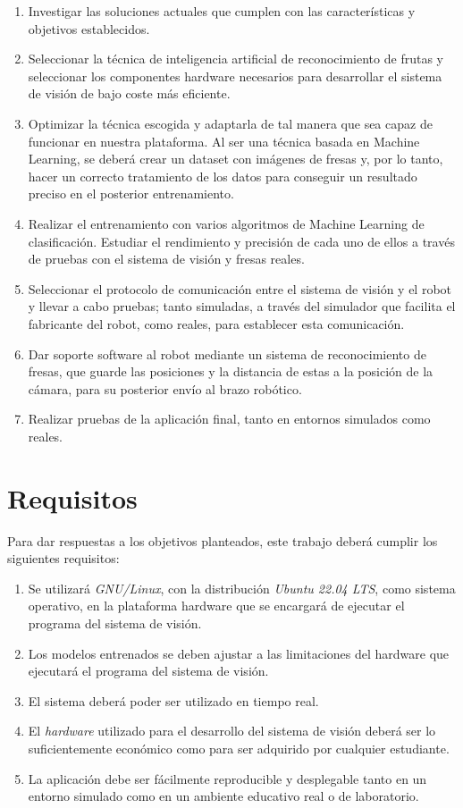 \begin{enumerate}
  \item Investigar las soluciones actuales que cumplen con las características y objetivos establecidos.
  \item Seleccionar la técnica de inteligencia artificial de reconocimiento de frutas y seleccionar los componentes hardware necesarios para desarrollar el sistema de visión de bajo coste más eficiente.
  \item Optimizar la técnica escogida y adaptarla de tal manera que sea capaz de funcionar en nuestra plataforma. Al ser una técnica basada en Machine Learning, se deberá crear un dataset con imágenes de fresas y, por lo tanto, hacer un correcto tratamiento de los datos para conseguir un resultado preciso en el posterior entrenamiento.
  \item Realizar el entrenamiento con varios algoritmos de Machine Learning de
clasificación. Estudiar el rendimiento y precisión de cada uno de ellos a través de pruebas con el sistema de visión y fresas reales.
  \item Seleccionar el protocolo de comunicación entre el sistema de visión y el robot y llevar a cabo pruebas; tanto simuladas, a través del simulador que facilita el fabricante del robot, como reales, para establecer esta comunicación.
  \item Dar soporte software al robot mediante un %
sistema de reconocimiento de fresas, que guarde las posiciones y la distancia de estas a la posición de la cámara, para su posterior envío al brazo robótico.
  \item Realizar pruebas de la aplicación final, tanto en entornos simulados como reales.
\end{enumerate} 


\section{Requisitos}
\label{sec:requisitos}

Para dar respuestas a los objetivos planteados, este trabajo deberá cumplir los siguientes requisitos:

\begin{enumerate}
  \item Se utilizará \textit{GNU/Linux}, con la distribución \textit{Ubuntu 22.04 LTS}, como sistema operativo, en la plataforma hardware que se encargará de ejecutar el programa del sistema de visión.
  \item Los modelos entrenados se deben ajustar a las limitaciones del hardware que ejecutará el programa del sistema de visión.
  \item El sistema deberá poder ser utilizado en tiempo real. 
  \item El \textit{hardware} utilizado para el desarrollo del sistema de visión deberá ser lo suficientemente económico como para ser adquirido por cualquier estudiante.
  \item La aplicación debe ser fácilmente reproducible y desplegable tanto en un entorno simulado como en un ambiente educativo real o de laboratorio.
\end{enumerate}  

